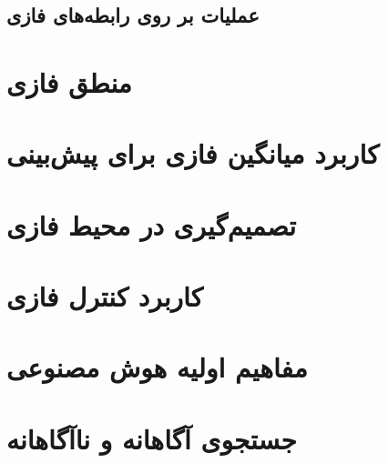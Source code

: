 \documentclass[12pt,a4paper]{article}
\theoremstyle{definition}
\begin{document}
 \subsection{عملیات بر روی رابطه‌های فازی}
\section{منطق فازی}
\section{کاربرد میانگین فازی برای پیش‌بینی}
\section{تصمیم‌گیری در محیط فازی}
\section{کاربرد کنترل فازی}
\section{مفاهیم اولیه هوش مصنوعی}
\section{جستجوی آگاهانه و ناآگاهانه}
\newpage
\begin{latin}
{
	\small
	\setlength{\itemsep}{-2ex}
	\renewcommand{\refname}{\rl{{مراجع}\hfill}}
	
}
\end{latin}
\end{document}
